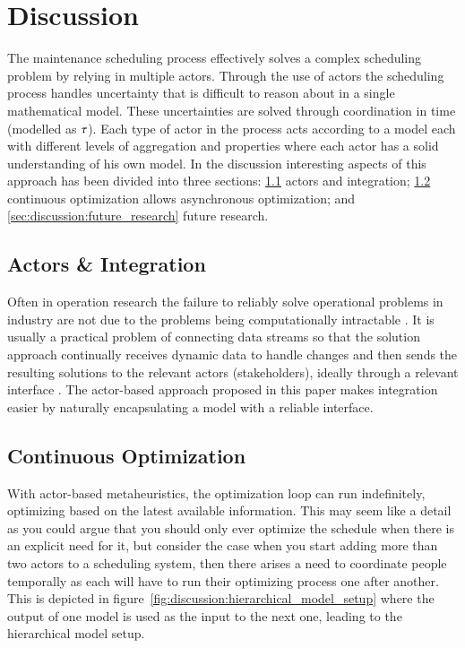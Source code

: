 \section{Discussion}\label{sec:4-discussion}
The maintenance scheduling process effectively solves a complex scheduling
problem by relying in multiple actors. Through the use of actors the scheduling
process handles uncertainty that is difficult to reason about in a single
mathematical model. These  uncertainties are solved through coordination in
time (modelled as $\tau$). Each type of actor in the process acts
according to a model each with different levels of aggregation and properties
where each actor has a solid understanding of his own model. In the discussion
interesting aspects of this approach has been divided into three 
sections: \ref{sec:discussion:actors_and_integration}
actors and integration; \ref{sec:discussion:continuous_optimization}
continuous optimization allows asynchronous optimization;  and
\ref{sec:discussion:future_research} future research.

\subsection{Actors \& Integration}\label{sec:discussion:actors_and_integration}
Often in operation research the failure to reliably solve operational
problems in industry are not due to the problems being computationally
intractable \citep{gendreauHandbookMetaheuristics2019}. It is usually a practical
problem of connecting data streams so that the solution approach continually
receives dynamic data to handle changes and then sends the resulting
solutions to the relevant actors (stakeholders), ideally through a relevant interface
\citep{meignanReviewTaxonomyInteractive2015}. The actor-based approach proposed
in this paper makes integration easier by naturally encapsulating a model with a
reliable interface.

\subsection{Continuous Optimization}\label{sec:discussion:continuous_optimization}
With actor-based metaheuristics, the optimization loop can run indefinitely,
optimizing based on the latest available information. This may seem like a
detail as you could argue that you should only ever optimize the schedule
when there is an explicit need for it, but consider the case when you start
adding more than two actors to a scheduling system, then there arises a need
to coordinate people temporally as each will have to run their optimizing
process one after another. This is depicted in figure~\ref{fig:discussion:hierarchical_model_setup}
where the output of one model is used as the input to the next one, leading
to the hierarchical model setup.

